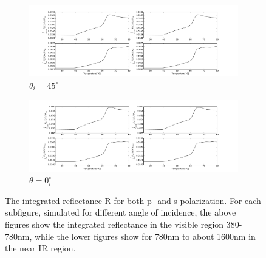 %
\begin{figure}[h!]
    \centering
    \begin{subfigure}[b]{\textwidth}
        \centering
        \includegraphics[width=\textwidth, trim={2.7cm 0.3cm 4cm 1.3cm},clip]{Results/Sim3/integratedReflectance.pdf}
        \caption{$\theta_i = 45^{\circ}$}
        \label{fig:dR10p}
        \vspace*{1cm}
    \end{subfigure}
    \begin{subfigure}[b]{\textwidth}
        \centering
        \includegraphics[width=\textwidth, trim={2.7cm 0.3cm 4cm 1.3cm},clip]{Results/Sim3/integratedReflectance_theta0.pdf}
        \caption{$\theta = 0_i^{\circ}$}
        \label{fig:dR15s}
    \end{subfigure}
    \caption{
       The integrated reflectance R for both p- and s-polarization. For each subfigure, simulated for
       different angle of incidence, the above figures show the integrated reflectance in the visible
       region 380-780nm, while the lower figures show for 780nm to about 1600nm in the near IR region.
    }
    \label{fig:dR}
\end{figure}
%
%
